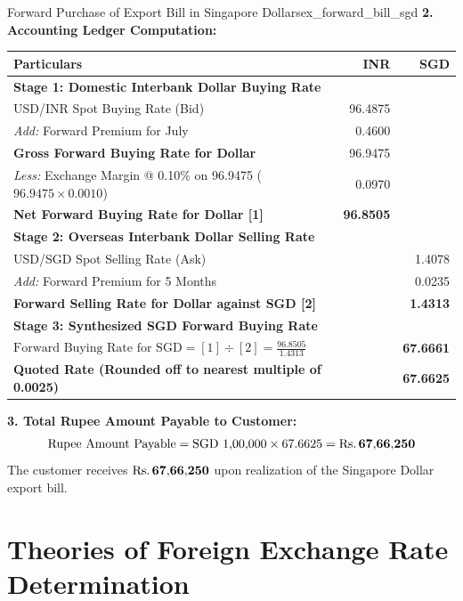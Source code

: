 \begin{example}{Forward Purchase of Export Bill in Singapore Dollars}{ex_forward_bill_sgd}
\noindent\textbf{2. Accounting Ledger Computation:}
\begin{center}
\begin{tabularx}{0.96\linewidth}{Xrr}
    \toprule
    \textbf{Particulars} & \textbf{INR} & \textbf{SGD} \\
    \midrule
    \textbf{Stage 1: Domestic Interbank Dollar Buying Rate} & & \\
    USD/INR Spot Buying Rate (Bid) & 96.4875 & \\
    \textit{Add:} Forward Premium for July & 0.4600 & \\
    \midrule
    \textbf{Gross Forward Buying Rate for Dollar} & 96.9475 & \\
    \textit{Less:} Exchange Margin @ 0.10\% on 96.9475 ($96.9475 \times 0.0010$) & 0.0970 & \\
    \midrule
    \textbf{Net Forward Buying Rate for Dollar [1]} & \textbf{96.8505} & \\
    \midrule
    \textbf{Stage 2: Overseas Interbank Dollar Selling Rate} & & \\
    USD/SGD Spot Selling Rate (Ask) & & 1.4078 \\
    \textit{Add:} Forward Premium for 5 Months & & 0.0235 \\
    \midrule
    \textbf{Forward Selling Rate for Dollar against SGD [2]} & & \textbf{1.4313} \\
    \midrule
    \textbf{Stage 3: Synthesized SGD Forward Buying Rate} & & \\
    $\text{Forward Buying Rate for SGD} = [1] \div [2] = \frac{96.8505}{1.4313}$ & & \textbf{67.6661} \\
    \textbf{Quoted Rate (Rounded off to nearest multiple of 0.0025)} & & \textbf{67.6625} \\
    \bottomrule
\end{tabularx}
\end{center}

\noindent\textbf{3. Total Rupee Amount Payable to Customer:}
\begin{equation}
    \text{Rupee Amount Payable} = \text{SGD } 1{,}00{,}000 \times 67.6625 = \mathbf{\text{Rs.}\, 67{,}66{,}250}
\end{equation}
The customer receives $\mathbf{\text{Rs.}\, 67{,}66{,}250}$ upon realization of the Singapore Dollar export bill.
\end{example}

\clearpage

\section{Theories of Foreign Exchange Rate Determination}

